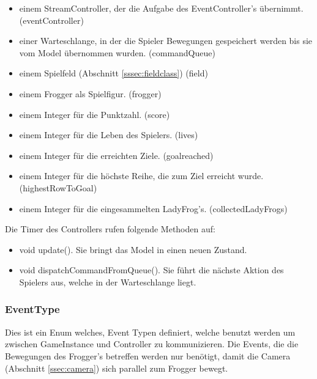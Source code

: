 \documentclass[a4paper,10pt]{report}
\begin{document}
{{{				\begin{itemize}
					\item einem StreamController, der die Aufgabe des EventController's übernimmt. (eventController)
					\item einer Warteschlange, in der die Spieler Bewegungen gespeichert werden bis sie vom Model übernommen wurden. (commandQueue)
					\item einem Spielfeld (Abschnitt \ref{sssec:fieldclass}) (field)
					\item einem Frogger als Spielfigur. (frogger)
					\item einem Integer für die Punktzahl. (score)
					\item einem Integer für die Leben des Spielers. (lives)
					\item einem Integer für die erreichten Ziele. (goalreached)
					\item einem Integer für die höchste Reihe, die zum Ziel erreicht wurde. \\ (highestRowToGoal)
					\item einem Integer für die eingesammelten LadyFrog's. (collectedLadyFrogs)			
				\end{itemize}								
				\noindent
				Die Timer des Controllers rufen folgende Methoden auf:
				
				\begin{itemize}
					\item void update(). Sie bringt das Model in einen neuen Zustand.
					\item void dispatchCommandFromQueue(). Sie führt die nächste Aktion des Spielers aus, welche in der Warteschlange liegt.
				\end{itemize}																
			}
			\newpage
			\subsubsection{EventType}
			{
				\label{sssec:eventtype}
				Dies ist ein Enum welches, Event Typen definiert, welche benutzt werden um zwischen GameInstance und Controller zu kommunizieren.
				Die Events, die die Bewegungen des Frogger's betreffen werden nur benötigt, damit die Camera (Abschnitt \ref{ssec:camera}) sich parallel zum Frogger bewegt.				
				
}}}
\end{document}
